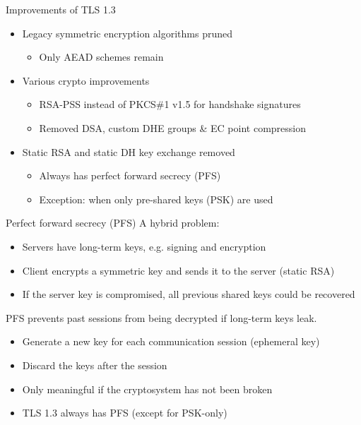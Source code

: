 \begin{frame}{Improvements of TLS 1.3}
  \begin{itemize}[<+(1)->]
    \item Legacy symmetric encryption algorithms pruned
    \begin{itemize}
      \item Only AEAD schemes remain
    \end{itemize}
    \item Various crypto improvements
    \par
    \begin{itemize}
      \item RSA-PSS instead of PKCS\#1 v1.5 for handshake signatures
      \item Removed DSA, custom DHE groups \& EC point compression
    \end{itemize}
    \item Static RSA and static DH key exchange removed
    \par
    \begin{itemize}
      \item Always has perfect forward secrecy (PFS)
      \item Exception: when only pre-shared keys (PSK) are used
    \end{itemize}
  \end{itemize}
\end{frame}

\begin{frame}{Perfect forward secrecy (PFS)}
  A hybrid problem:
  \begin{itemize}[<+(1)->]
    \item Servers have long-term keys, e.g. signing and encryption
    \item Client encrypts a symmetric key and sends it to the server (static RSA)
    \item If the server key is compromised, all previous shared keys could be recovered
  \end{itemize}

  \vspace*{1em}

  \pause
  PFS prevents past sessions from being decrypted if long-term keys leak.
  \begin{itemize}[<+(1)->]
    \item Generate a new key for each communication session (ephemeral key)
    \item Discard the keys after the session
    \item Only meaningful if the cryptosystem has not been broken
    \item TLS 1.3 always has PFS (except for PSK-only)
  \end{itemize}
\end{frame}

